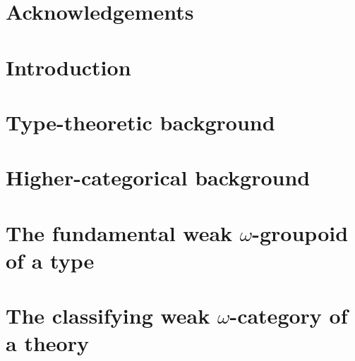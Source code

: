 \documentclass[11pt]{amsbook}
\begin{document}


%
%

\chapter*{Acknowledgements}


\mainmatter

\chapter*{Introduction}





\chapter{Type-theoretic background}
\label{ch:dtt-background}



\chapter{Higher-categorical background}
\label{ch:cat-background}



\chapter{The fundamental weak \texorpdfstring{$\omega$}{ω}-groupoid of a type} \label{ch:fundamental}



\chapter{The classifying weak \texorpdfstring{$\omega$}{ω}-category of a theory} \label{ch:classifying}






















\backmatter




\end{document}
